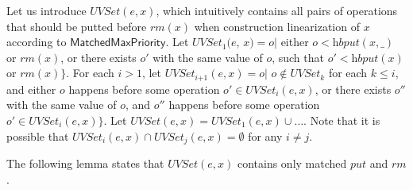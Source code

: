 Let us introduce $\textit{UVSet}(e,x)$, which intuitively contains all pairs of operations that should be putted before $\textit{rm}(x)$ when construction linearization of $x$ according to $\mathsf{MatchedMaxPriority}$. Let $\textit{UVSet}_1(e$, $x) = o \vert$ either $o <{\textit{hb}} \textit{put}(x,\_)$ or $\textit{rm}(x)$, or there exists $o'$ with the same value of $o$, such that $o' <{\textit{hb}} \textit{put}(x)$ or $\textit{rm}(x) \}$. For each $i > 1$, let $\textit{UVSet}_{\textit{i+1}}(e,x) = o \vert$ $o \notin \textit{UVSet}_k$ for each $k \leq i$, and either $o$ happens before some operation $o' \in \textit{UVSet}_i(e,x)$, or there exists $o''$ with the same value of $o$, and $o''$ happens before some operation $o' \in \textit{UVSet}_i(e,x) \}$. Let $\textit{UVSet}(e,x) = \textit{UVSet}_1(e,x) \cup \ldots$. Note that it is possible that $\textit{UVSet}_i(e,x) \cap \textit{UVSet}_j(e,x) = \emptyset$ for any $i \neq j$.

The following lemma states that $\textit{UVSet}(e,x)$ contains only matched $\textit{put}$ and $\textit{rm}$.

